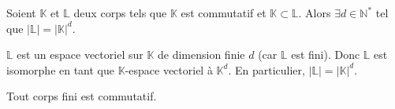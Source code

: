 



	

	\begin{lemma}
		\label{theoreme-de-wedderburn-1}
		Soient $\mathbb{K}$ et $\mathbb{L}$ deux corps tels que $\mathbb{K}$ est commutatif et $\mathbb{K} \subset \mathbb{L}$. Alors $\exists d \in \mathbb{N}^*$ tel que $|\mathbb{L}| = |\mathbb{K}|^d$.
	\end{lemma}
	
	\begin{demonstration}
		$\mathbb{L}$ est un espace vectoriel sur $\mathbb{K}$ de dimension finie $d$ (car $\mathbb{L}$ est fini). Donc $\mathbb{L}$ est isomorphe en tant que $\mathbb{K}$-espace vectoriel à $\mathbb{K}^d$. En particulier, $|\mathbb{L}| = |\mathbb{K}|^d$.
	\end{demonstration}
	
	\begin{theorem}[Wedderburn]
		Tout corps fini est commutatif.
	\end{theorem}
	
